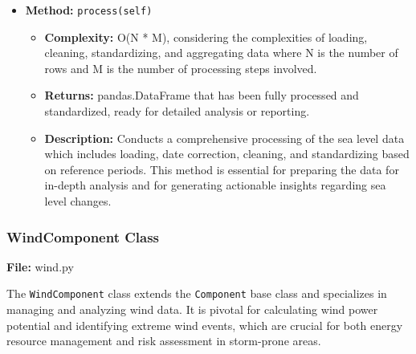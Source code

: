 \documentclass[a4paper,12pt]{article}
\begin{document}
\begin{itemize}
    \item \textbf{Method:} \texttt{process(self)}
    \begin{itemize}
        \item \textbf{Complexity:} O(N * M), considering the complexities of loading, cleaning, standardizing, and aggregating data where N is the number of rows and M is the number of processing steps involved.
        \item \textbf{Returns:} pandas.DataFrame that has been fully processed and standardized, ready for detailed analysis or reporting.
        \item \textbf{Description:} Conducts a comprehensive processing of the sea level data which includes loading, date correction, cleaning, and standardizing based on reference periods. This method is essential for preparing the data for in-depth analysis and for generating actionable insights regarding sea level changes.
    \end{itemize}
\end{itemize}



\subsubsection{WindComponent Class}
\textbf{File:} wind.py

The \texttt{WindComponent} class extends the \texttt{Component} base class and specializes in managing and analyzing wind data. It is pivotal for calculating wind power potential and identifying extreme wind events, which are crucial for both energy resource management and risk assessment in storm-prone areas.
\end{document}
